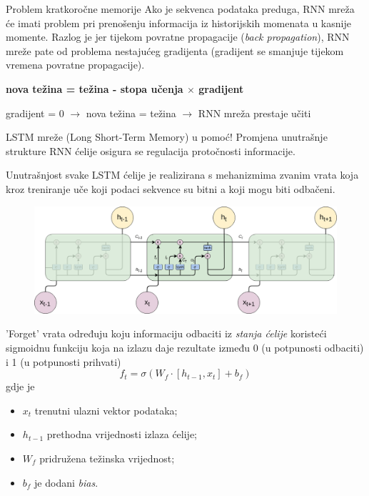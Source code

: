 \documentclass{beamer}
\begin{document}
  \begin{frame}{Problem kratkoročne memorije}
    Ako je sekvenca podataka preduga, RNN mreža će imati problem pri prenošenju informacija iz historijskih momenata u kasnije momente.
    Razlog je jer tijekom povratne propagacije (\textit{back propagation}), RNN mreže pate od problema nestajućeg gradijenta (gradijent se smanjuje tijekom vremena povratne propagacije).

    \begin{center}
      \textbf{nova težina = težina - stopa učenja $\times$ gradijent}

      gradijent = 0 $\rightarrow$ nova težina = težina $\rightarrow$ RNN mreža prestaje učiti 
    \end{center}
  \end{frame}

  \begin{frame}{LSTM mreže (Long Short-Term Memory) u pomoć!}
    Promjena unutrašnje strukture RNN ćelije osigura se regulacija protočnosti informacije.

    Unutrašnjost svake LSTM ćelije je realizirana s mehanizmima zvanim \alert{vrata} koja kroz treniranje uče koji podaci sekvence su bitni a koji mogu biti odbačeni.
  \end{frame}
  \begin{frame}
    \begin{figure}[]
      \centering
      \includegraphics[width=\linewidth]{images/LSTM.png}
    \end{figure}
  \end{frame}

  \begin{frame}{'Forget' vrata}  
    određuju koju informaciju odbaciti iz \textit{stanja ćelije} koristeći sigmoidnu funkciju koja na izlazu daje rezultate između 0 (u potpunosti odbaciti) i 1 (u potpunosti prihvati)
    $$ f_{t} = \sigma (W_{f} \cdot [h_{t-1}, x_{t}] + b_{f}) $$
		gdje je
		\begin{itemize}
			\item[] $ x_{t} $ trenutni ulazni vektor podataka;
			\item[] $ h_{t-1} $ prethodna vrijednosti izlaza ćelije;
			\item[] $ W_{f} $ pridružena težinska vrijednost;
			\item[] $ b_{f} $ je dodani \textit{bias}.
    \end{itemize}
  \end{frame}
\end{document}

